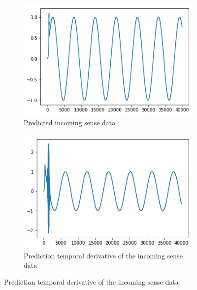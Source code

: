 \begin{figure}[H]
\bigskip
\begin{subfigure}{.3\linewidth}
    \centering
    \includegraphics[scale=0.5]{chapter_3_figures/dynamics_sine_wave_predphi.png}
    \caption{Predicted incoming sense data}
\end{subfigure}
    \hfill
\begin{subfigure}{.3\linewidth}
    \centering
    \includegraphics[scale=0.5]{chapter_3_figures/dynamics_sine_wave_pred_phidot.png}
    \caption{Prediction temporal derivative of the incoming sense data}
\end{subfigure}

\bigskip
  

\end{figure}
